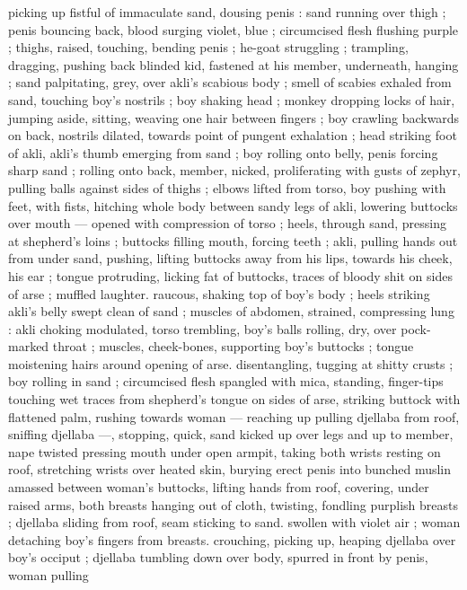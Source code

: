 picking up fistful of immaculate sand, dousing penis : sand running
over thigh ; penis bouncing back, blood surging violet, blue ;
circumcised flesh flushing purple ; thighs, raised, touching, bending
penis ; he-goat struggling ; trampling, dragging, pushing back
blinded kid, fastened at his member, underneath, hanging ; sand
palpitating, grey, over akli's scabious body ; smell of scabies exhaled
from sand, touching boy's nostrils ; boy shaking head ; monkey
dropping locks of hair, jumping aside, sitting, weaving one hair
between fingers ; boy crawling backwards on back, nostrils dilated,
towards point of pungent exhalation ; head striking foot of akli, akli’s
thumb emerging from sand ; boy rolling onto belly, penis forcing
sharp sand ; rolling onto back, member, nicked, proliferating with
gusts of zephyr, pulling balls against sides of thighs ; elbows lifted
from torso, boy pushing with feet, with fists, hitching whole body
between sandy legs of akli, lowering buttocks over mouth --- opened
with compression of torso ; heels, through sand, pressing at
shepherd's loins ; buttocks filling mouth, forcing teeth ; akli, pulling
hands out from under sand, pushing, lifting buttocks away from his
lips, towards his cheek, his ear ; tongue protruding, licking fat of
buttocks, traces of bloody shit on sides of arse ; muffled laughter.
raucous, shaking top of boy’s body ; heels striking akli’s belly swept
clean of sand ; muscles of abdomen, strained, compressing lung :
akli choking modulated, torso trembling, boy's balls rolling, dry, over
pock-marked throat ; muscles, cheek-bones, supporting boy's
buttocks ; tongue moistening hairs around opening of arse.
disentangling, tugging at shitty crusts ; boy rolling in sand ;
circumcised flesh spangled with mica, standing, finger-tips touching
wet traces from shepherd's tongue on sides of arse, striking buttock
with flattened palm, rushing towards woman --- reaching up pulling
djellaba from roof, sniffing djellaba ---, stopping, quick, sand kicked
up over legs and up to member, nape twisted pressing mouth under
open armpit, taking both wrists resting on roof, stretching wrists over
heated skin, burying erect penis into bunched muslin amassed
between woman's buttocks, lifting hands from roof, covering, under
raised arms, both breasts hanging out of cloth, twisting, fondling
purplish breasts ; djellaba sliding from roof, seam sticking to sand.
swollen with violet air ; woman detaching boy's fingers from breasts.
crouching, picking up, heaping djellaba over boy's occiput ; djellaba
tumbling down over body, spurred in front by penis, woman pulling
